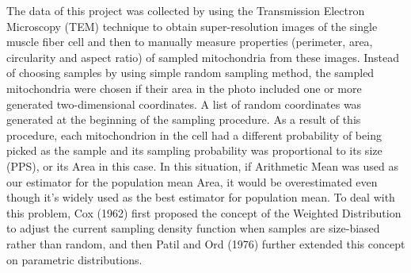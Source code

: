 \documentclass{article}\usepackage[]{graphicx}\usepackage[]{color}
\numberwithin{figure}{subsection} %
\numberwithin{table}{subsection} %
\begin{document}
The data of this project was collected by using the Transmission Electron Microscopy (TEM) technique to obtain super-resolution images of the single muscle fiber cell and then to manually measure properties (perimeter, area, circularity and aspect ratio) of sampled mitochondria from these images. Instead of choosing samples by using simple random sampling method, the sampled mitochondria were chosen if their area in the photo included one or more generated two-dimensional coordinates. A list of random coordinates was generated at the beginning of the sampling procedure. As a result of this procedure, each mitochondrion in the cell had a different probability of being picked as the sample and its sampling probability was proportional to its size (PPS), or its Area in this case. In this situation, if Arithmetic Mean was used as our estimator for the population mean Area, it would be overestimated even though it's widely used as the best estimator for population mean. To deal with this problem, Cox (1962) first proposed the concept of the Weighted Distribution to adjust the current sampling density function when samples are size-biased rather than random, and then Patil and Ord (1976) further extended this concept on parametric distributions. 
\end{document}
